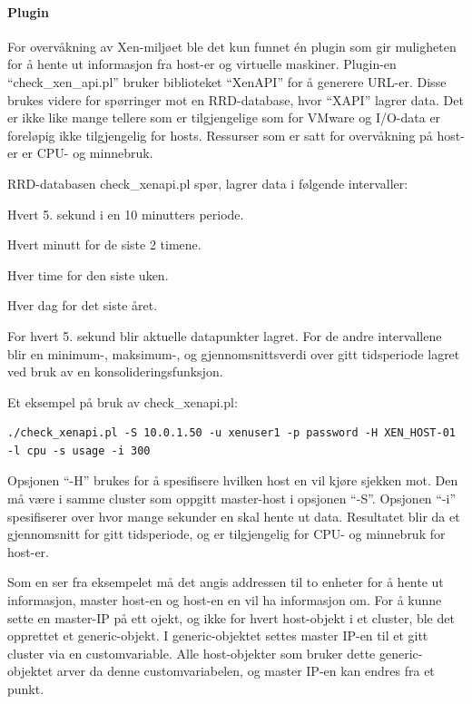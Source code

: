 \paragraph{Plugin}  \mbox\\

For overvåkning av Xen-miljøet ble det kun funnet én plugin som gir muligheten for å hente ut informasjon fra host-er og virtuelle maskiner. Plugin-en ``check\_xen\_api.pl'' bruker biblioteket ``XenAPI'' for å generere URL-er. Disse brukes videre for spørringer mot en RRD-database, hvor ``XAPI'' lagrer data\cite{xenwiki}. Det er ikke like mange tellere som er tilgjengelige som for VMware og I/O-data er foreløpig ikke tilgjengelig for hosts. Ressurser som er satt for overvåkning på host-er er CPU- og minnebruk.

RRD-databasen check\_xenapi.pl spør, lagrer data i følgende intervaller:
\begin{enumerate*}
        \item Hvert 5. sekund i en 10 minutters periode.
        \item Hvert minutt for de siste 2 timene.
        \item Hver time for den siste uken.
        \item Hver dag for det siste året.
\end{enumerate*}

For hvert 5. sekund blir aktuelle datapunkter lagret. For de andre intervallene blir en minimum-, maksimum-, og gjennomsnittsverdi over gitt tidsperiode lagret ved bruk av en konsolideringsfunksjon. \cite{xenrrd}

Et eksempel på bruk av check\_xenapi.pl: 
\begin{lstlisting}[style=example]
./check_xenapi.pl -S 10.0.1.50 -u xenuser1 -p password -H XEN_HOST-01 -l cpu -s usage -i 300
\end{lstlisting}

Opsjonen ``-H'' brukes for å spesifisere hvilken host en vil kjøre sjekken mot. Den må være i samme cluster som oppgitt master-host i opsjonen ``-S''. Opsjonen ``-i'' spesifiserer over hvor mange sekunder en skal hente ut data. Resultatet blir da et gjennomsnitt for gitt tidsperiode, og er tilgjengelig for CPU- og minnebruk for host-er.

Som en ser fra eksempelet må det angis addressen til to enheter for å hente ut informasjon, master host-en og host-en en vil ha informasjon om. For å kunne sette en master-IP på ett ojekt, og ikke for hvert host-objekt i et cluster, ble det opprettet et generic-objekt. I generic-objektet settes master IP-en til et gitt cluster via en customvariable. Alle host-objekter som bruker dette generic-objektet arver da denne customvariabelen, og master IP-en kan endres fra et punkt.

